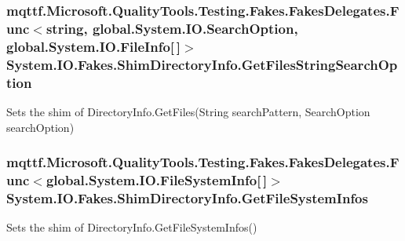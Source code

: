 \hypertarget{class_system_1_1_i_o_1_1_fakes_1_1_shim_directory_info_a61b1fed653e42cd8a079b6dc3083f6af}{
\subsubsection[{Get\-Files\-String\-Search\-Option}]{\setlength{\rightskip}{0pt plus 5cm}mqttf.\-Microsoft.\-Quality\-Tools.\-Testing.\-Fakes.\-Fakes\-Delegates.\-Func$<$string, global.\-System.\-I\-O.\-Search\-Option, global.\-System.\-I\-O.\-File\-Info\mbox{[}$\,$\mbox{]}$>$ System.\-I\-O.\-Fakes.\-Shim\-Directory\-Info.\-Get\-Files\-String\-Search\-Option\hspace{0.3cm}{\ttfamily [set]}}}\label{class_system_1_1_i_o_1_1_fakes_1_1_shim_directory_info_a61b1fed653e42cd8a079b6dc3083f6af}


Sets the shim of Directory\-Info.\-Get\-Files(\-String search\-Pattern, Search\-Option search\-Option)

\hypertarget{class_system_1_1_i_o_1_1_fakes_1_1_shim_directory_info_a77a13060d08de13f8b2d5555cf4f7111}{
\subsubsection[{Get\-File\-System\-Infos}]{\setlength{\rightskip}{0pt plus 5cm}mqttf.\-Microsoft.\-Quality\-Tools.\-Testing.\-Fakes.\-Fakes\-Delegates.\-Func$<$global.\-System.\-I\-O.\-File\-System\-Info\mbox{[}$\,$\mbox{]}$>$ System.\-I\-O.\-Fakes.\-Shim\-Directory\-Info.\-Get\-File\-System\-Infos\hspace{0.3cm}{\ttfamily [set]}}}\label{class_system_1_1_i_o_1_1_fakes_1_1_shim_directory_info_a77a13060d08de13f8b2d5555cf4f7111}


Sets the shim of Directory\-Info.\-Get\-File\-System\-Infos()

